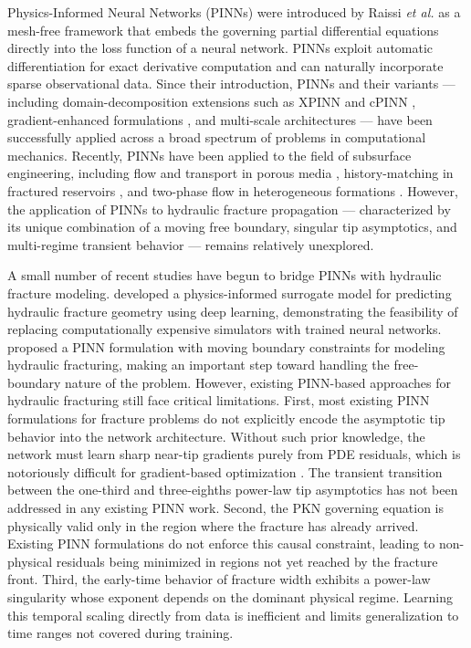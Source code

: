 \documentclass{ws-ijcm}
\begin{document}
Physics-Informed Neural Networks (PINNs) were introduced by Raissi
\emph{et al.} \cite{Raissi2019} as a mesh-free framework that embeds
the governing partial differential equations directly into the loss
function of a neural network. PINNs exploit automatic differentiation
for exact derivative computation and can naturally incorporate sparse
observational data. Since their introduction, PINNs and their variants
--- including domain-decomposition extensions such as XPINN
\cite{Jagtap2020} and cPINN \cite{Jagtap2020b}, gradient-enhanced
formulations \cite{Yu2022}, and multi-scale architectures
\cite{Moseley2023} --- have been successfully applied across a broad
spectrum of problems in computational mechanics. Recently, PINNs have
been applied to the field of subsurface engineering, including flow and
transport in porous media \cite{Hassan2024}, history-matching in
fractured reservoirs \cite{Ali2025}, and two-phase flow in heterogeneous
formations \cite{Wang2024}. However, the application of PINNs to
hydraulic fracture propagation --- characterized by its unique
combination of a moving free boundary, singular tip asymptotics, and
multi-regime transient behavior --- remains relatively unexplored.

A small number of recent studies have begun to bridge PINNs with
hydraulic fracture modeling. \cite{Yang2023} developed a
physics-informed surrogate model for predicting hydraulic fracture
geometry using deep learning, demonstrating the feasibility of replacing
computationally expensive simulators with trained neural networks.
\cite{Tang2024} proposed a PINN formulation with moving boundary
constraints for modeling hydraulic fracturing, making an important step
toward handling the free-boundary nature of the problem. However,
existing PINN-based approaches for hydraulic fracturing still face
critical limitations. First, most existing PINN formulations for
fracture problems do not explicitly encode the asymptotic tip behavior
into the network architecture. Without such prior knowledge, the network
must learn sharp near-tip gradients purely from PDE residuals, which is
notoriously difficult for gradient-based optimization
\cite{Krishnapriyan2021}. The transient transition between the
one-third and three-eighths power-law tip asymptotics has not been
addressed in any existing PINN work. Second, the PKN governing equation
is physically valid only in the region where the fracture has already
arrived. Existing PINN formulations do not enforce this causal
constraint, leading to non-physical residuals being minimized in regions
not yet reached by the fracture front. Third, the early-time behavior
of fracture width exhibits a power-law singularity whose exponent
depends on the dominant physical regime. Learning this temporal scaling
directly from data is inefficient and limits generalization to time
ranges not covered during training.
\end{document}
